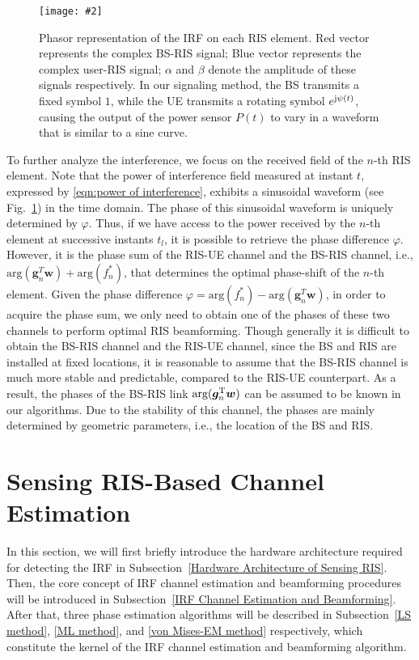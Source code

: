 \documentclass[12pt,draftclsnofoot,journal,onecolumn]{IEEEtran}
\theoremstyle{nonumberplain}
\def \arg {\text{arg}}
\newcommand{\myincludegraphics}[2][width=12cm]{\texttt{[image: \#2]}}
\begin{document}
    \begin{figure}[!t]
        \centering
        \myincludegraphics{figures/phasor.pdf}
        \caption{Phasor representation of the \ac{IRF} on each RIS element. Red vector represents the complex BS-RIS signal; Blue vector represents the complex user-RIS signal; $\alpha$ and $\beta$ denote the amplitude of these signals respectively. In our signaling method, the BS transmits a fixed symbol $1$, while the UE transmits a rotating symbol $e^{{\rm j}\psi(t)}$, causing the output of the power sensor $P(t)$ to vary in a waveform that is similar to a sine curve.}
        \label{fig:phasor}
    \end{figure}
    To further analyze the interference, we focus on the received field of the $n$-th RIS element. Note that the power of interference field measured at instant $t$, expressed by \eqref{eqn:power of interference}, exhibits a sinusoidal waveform (see Fig.~\ref{fig:phasor}) in the time domain. The phase of this sinusoidal waveform is uniquely determined by $\varphi$.
    Thus, if we have access to the power received by the $n$-th element at successive instants $t_l$, it is possible to retrieve the phase difference $\varphi$. However, it is the phase sum of the RIS-UE channel and the BS-RIS channel, i.e., $\arg({\bm g}_n^{T}{\bm w})+\arg(f_n^*)$, that determines the optimal phase-shift of the $n$-th element. Given the phase difference $\varphi = \arg\left(f_{n}^{*}\right)-\arg\left(\bm g_{n}^{T}\bm w\right)$, in order to acquire the phase sum, we only need to obtain one of the phases of these two channels to perform optimal RIS beamforming. Though generally it is difficult to obtain the BS-RIS channel and the RIS-UE channel, since the BS and RIS are installed at fixed locations, it is reasonable to assume that the BS-RIS channel is much more stable and predictable, compared to the RIS-UE counterpart. As a result, the phases of the BS-RIS link $\arg({\bm g}_n^{\rm T}{\bm w})$ can be assumed to be known in our algorithms. Due to the stability of this channel, the phases are mainly determined by geometric parameters, i.e., the location of the BS and RIS. 

    

\section{Sensing RIS-Based Channel Estimation}
\label{Sensing RIS-Based Channel Estimation}
In this section, we will first briefly introduce the hardware architecture required for detecting the \ac{IRF} in Subsection~\ref{Hardware Architecture of Sensing RIS}. Then, the core concept of IRF channel estimation and beamforming procedures will be introduced in Subsection~\ref{IRF Channel Estimation and Beamforming}. After that, three phase estimation algorithms will be described in Subsection~\ref{LS method}, \ref{ML method}, and \ref{von Mises-EM method} respectively, which constitute the kernel of the \ac{IRF} channel estimation and beamforming algorithm. 
\end{document}
